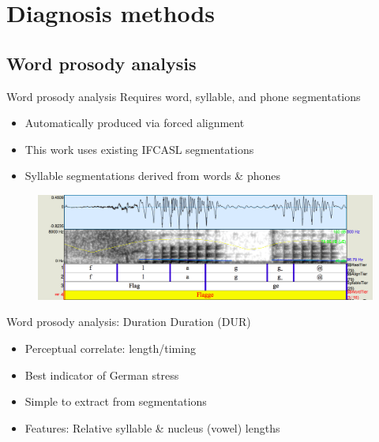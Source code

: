 \documentclass[xcolor={dvipsnames}]{beamer}
\newcommand{\TODO}[1]{{\color{red}\textbf{[TODO #1]}}}
\begin{document}

\section{Diagnosis methods}

{ 
}

	\subsection{Word prosody analysis}
		\begin{frame}{Word prosody analysis}
		Requires word, syllable, and phone segmentations
			\begin{itemize}
			\item Automatically produced via forced alignment
			\item This work uses existing IFCASL segmentations
			\item Syllable segmentations derived from words \& phones
			\end{itemize}
			
			\begin{figure}
			\includegraphics[width=\textwidth]{2SH05_FGMB1_527-flagge}
			\end{figure}
		\end{frame}
		
		\begin{frame}{Word prosody analysis: Duration}
		Duration (DUR)
			\begin{itemize}
			\item Perceptual correlate: length/timing
			\item Best indicator of German stress
			\item Simple to extract from segmentations
			\item Features: Relative syllable \& nucleus (vowel) lengths
			\end{itemize}
				
		\end{frame}		
		
\end{document}
